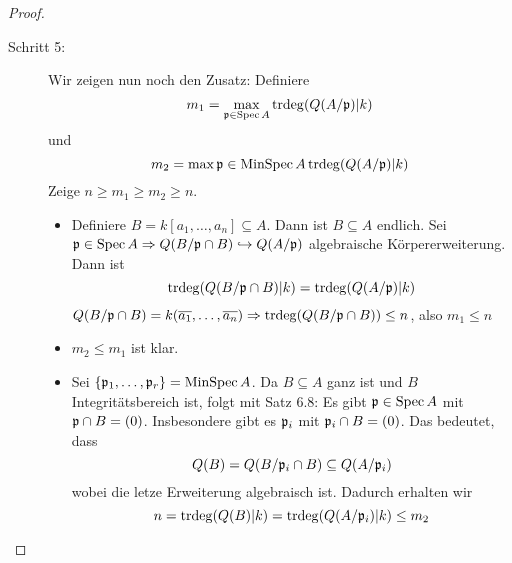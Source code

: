\documentclass[12pt,a4paper]{scrartcl}
\theoremstyle{cplain}
\theoremstyle{cdef}
\begin{document}
\begin{proof}
\begin{description}
		\item[Schritt 5:] Wir zeigen nun noch den Zusatz: Definiere
		$$m_1 = \max_{\mathfrak{p}\in \operatorname{Spec} A}\operatorname{trdeg}(Q(A/\mathfrak{p})|k)$$
		und
		$$m_2 = \max{\mathfrak{p}\in\operatorname{MinSpec} A} \operatorname{trdeg}(Q(A/\mathfrak{p})|k)$$
		Zeige $n\geq m_1\geq m_2\geq n$.
		\begin{itemize}
			\item Definiere $B = k[a_1,\dots, a_n] \subseteq A$. Dann ist $B\subseteq A$ endlich. Sei $\mathfrak{p}\in\operatorname{Spec} A \Rightarrow Q(B/\mathfrak{p}\cap B)\hookrightarrow Q(A/\mathfrak{p})$ algebraische Körpererweiterung. Dann ist
			$$\operatorname{trdeg}(Q(B/\mathfrak{p}\cap B)|k) = \operatorname{trdeg}(Q(A/\mathfrak{p})|k)$$
			$Q(B/\mathfrak{p}\cap B) = k(\overline{a_1},\dots, \overline{a_n})\Rightarrow \operatorname{trdeg}(Q(B/\mathfrak{p}\cap B))\leq n$, also $m_1\leq n$
			\item $m_2\leq m_1$ ist klar.
			\item Sei $\{\mathfrak{p}_1,\dots , \mathfrak{p}_r\} = \operatorname{MinSpec}A$. Da $B\subseteq A$ ganz ist und $B$ Integritätsbereich ist, folgt mit Satz 6.8: Es gibt $\mathfrak{p}\in \operatorname{Spec} A$ mit $\mathfrak{p}\cap B = (0)$. Insbesondere gibt es $\mathfrak{p}_i$ mit $\mathfrak{p}_i\cap B = (0)$. Das bedeutet, dass
			$$Q(B) = Q(B/\mathfrak{p}_i\cap B)\subseteq Q(A/\mathfrak{p}_i)$$
			wobei die letze Erweiterung algebraisch ist. Dadurch erhalten wir
			$$ n = \operatorname{trdeg}(Q(B)|k) = \operatorname{trdeg}(Q(A/\mathfrak{p}_i)|k) \leq m_2$$
		\end{itemize}
	\end{description}
\end{proof}

\end{document}
